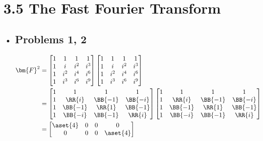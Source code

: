 \section{3.5 The Fast Fourier Transform}
\begin{itemize}
  \item[]

  \subsection{Problems 1, 2}
  \begin{itemize}
    \begin{align*}
      \bm{F}^2 &=
      \begin{bmatrix}
        1 & 1 & 1 & 1 \\
        1 & i & i^2 & i^3 \\
        1 & i^2 & i^4 & i^6 \\
        1 & i^3 & i^6 & i^9
      \end{bmatrix}
      \begin{bmatrix}
        1 & 1 & 1 & 1 \\
        1 & i & i^2 & i^3 \\
        1 & i^2 & i^4 & i^6 \\
        1 & i^3 & i^6 & i^9
      \end{bmatrix} \\
      &=
      \begin{bmatrix}
        1 & 1 & 1 & 1 \\
        1 & \RR{i} & \BB{-1} & \BB{-i} \\
        1 & \BB{-1} & \RR{1} & \BB{-1} \\
        1 & \BB{-i} & \BB{-1} & \RR{i}
      \end{bmatrix}
      \begin{bmatrix}
        1 & 1 & 1 & 1 \\
        1 & \RR{i} & \BB{-1} & \BB{-i} \\
        1 & \BB{-1} & \RR{1} & \BB{-1} \\
        1 & \BB{-i} & \BB{-1} & \RR{i}
      \end{bmatrix} \\
      &=
      \begin{bmatrix}
          \aset{4} & 0 & 0 & 0\\
          0 & 0 & 0 & \aset{4}\\

\end{bmatrix}
\end{align*}
\end{itemize}
\end{itemize}
